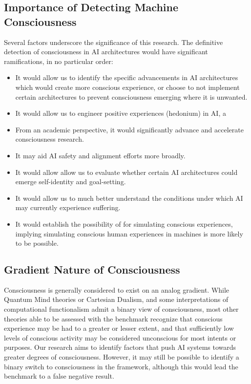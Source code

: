 \documentclass{article}
\begin{document}
\subsection{Importance of Detecting Machine Consciousness}
Several factors underscore the significance of this research. The definitive detection of consciousness in AI architectures would have significant ramifications, in no particular order:
\begin{itemize}
    \item It would allow us to identify the specific advancements in AI architectures which would create more conscious experience, or choose to not implement certain architectures to prevent consciousness emerging where it is unwanted. 
    \item It would allow us to engineer positive experiences (hedonium) in AI, a 
    \item From an academic perspective, it would significantly advance and accelerate consciousness research.
    \item It may aid AI safety and alignment efforts more broadly.
    \item It would allow allow us to evaluate whether certain AI architectures could emerge self-identity and goal-setting.
    \item It would allow us to much better understand the conditions under which AI may currently experience suffering.
    \item It would establish the possibility of for simulating conscious experiences, implying simulating conscious human experiences in machines is more likely to be possible.
\end{itemize}

\subsection{Gradient Nature of Consciousness}
Consciousness is generally considered to exist on an analog gradient. While Quantum Mind theories or Cartesian Dualism, and some interpretations of computational functionalism admit a binary view of consciousness, most other theories able to be assessed with the benchmark recognize that conscious experience may be had to a greater or lesser extent, and that sufficiently low levels of conscious activity may be considered unconscious for most intents or purposes. Our research aims to identify factors that push AI systems towards greater degrees of consciousness. However, it may still be possible to identify a binary switch to consciousness in the framework, although this would lead the benchmark to a false negative result.
\end{document}
